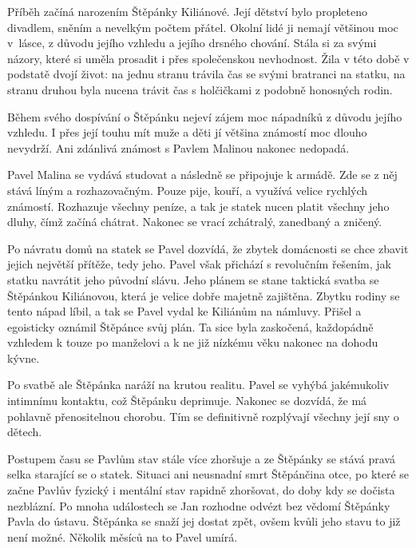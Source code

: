 
\newpart
{}
Příběh začíná narozením Štěpánky Kiliánové. Její dětství bylo propleteno
divadlem, sněním a nevelkým počtem přátel. Okolní lidé ji nemají většinou moc
v~lásce, z důvodu jejího vzhledu a jejího drsného chování. Stála si za svými
názory, které si uměla prosadit i přes společenskou nevhodnost. Žila v této
době v podstatě dvojí život: na jednu stranu trávila čas se svými bratranci na
statku, na stranu druhou byla nucena trávit čas s holčičkami z podobně
honosných rodin.

Během svého dospívání o Štěpánku nejeví zájem moc nápadníků z důvodu jejího
vzhledu. I přes její touhu mít muže a děti jí většina známostí moc dlouho
nevydrží. Ani zdánlivá známost s Pavlem Malinou nakonec nedopadá.

Pavel Malina se vydává studovat a následně se připojuje k armádě. Zde se z něj
stává líným a rozhazovačným. Pouze pije, kouří, a využívá velice rychlých
známostí. Rozhazuje všechny peníze, a tak je statek nucen platit všechny jeho
dluhy, čímž začíná chátrat. Nakonec se vrací zchátralý, zanedbaný a zničený.

Po návratu domů na statek se Pavel dozvídá, že zbytek domácnosti se chce zbavit
jejich největší přítěže, tedy jeho. Pavel však přichází s revolučním řešením,
jak statku navrátit jeho původní slávu. Jeho plánem se stane taktická svatba se
Štěpánkou Kiliánovou, která je velice dobře majetně zajištěna. Zbytku rodiny se
tento nápad líbil, a tak se Pavel vydal ke Kiliánům na námluvy. Přišel a
egoisticky oznámil Štěpánce svůj plán. Ta sice byla zaskočená, každopádně
vzhledem k touze po manželovi a k ne již nízkému věku nakonec na dohodu kývne.

Po svatbě ale Štěpánka naráží na krutou realitu. Pavel se vyhýbá jakémukoliv
intimnímu kontaktu, což Štěpánku deprimuje. Nakonec se dozvídá, že má pohlavně
přenositelnou chorobu. Tím se definitivně rozplývají všechny její sny o dětech.

Postupem času se Pavlům stav stále více zhoršuje a ze Štěpánky se stává pravá
selka starající se o statek. Situaci ani neusnadní smrt Štěpánčina otce, po
které se začne Pavlův fyzický i mentální stav rapidně zhoršovat, do doby kdy se
dočista nezblázní. Po mnoha událostech se Jan rozhodne odvézt bez vědomí
Štěpánky Pavla do ústavu. Štěpánka se snaží jej dostat zpět, ovšem kvůli jeho
stavu to již není možné. Několik měsíců na to Pavel umírá.

